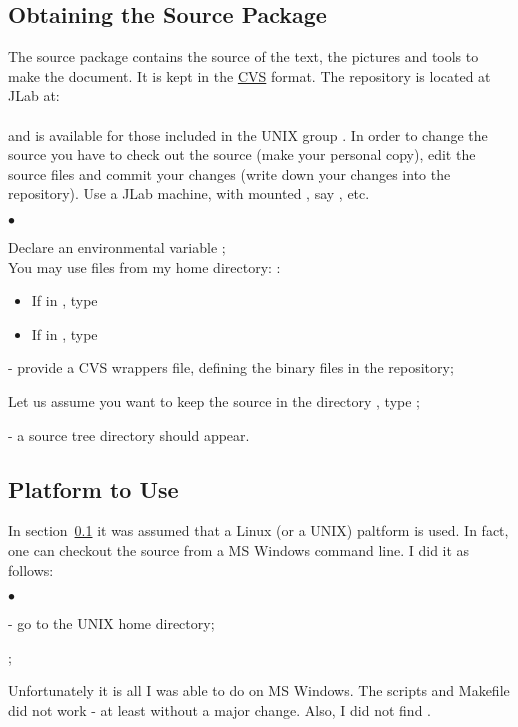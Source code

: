 \documentclass[12pt,letterpaper]{article}
\begin{document}
\subsection{Obtaining the Source Package}
\label{sec:obtain}

 The source package contains the source of the text, 
 the pictures and tools to make the document.
 It is kept in the \href{http://www.cvshome.org/}{CVS}\cite{CVSwww} format.
 The repository is located at JLab at: \\
  \\
 and is available for those included in the UNIX group .
 In order to change the source you have to check out the source
 (make your personal copy), edit the source files and commit
 your changes (write down your changes into the repository). Use
 a JLab machine, with mounted , say ,  etc.
  \begin{list}{$\bullet$}{\setlength{\itemsep}{-0.15cm}}
    \item Declare an environmental variable ;\\
          You may use files from my home directory: :
        \begin{itemize} 
            \item If in , type 
            \item If in , type 
        \end{itemize}
    \item {} - provide a CVS wrappers file,
           defining the binary files in the repository;
    \item Let us assume you want to keep the source in the directory ,
          type ;
    \item {} - a source tree directory 
          should appear. 
  \end{list}
 
   
\subsection{Platform to Use}
\label{sec:platform}   

  In section~\ref{sec:obtain} it was assumed that a Linux (or a UNIX) paltform
  is used. In fact, one can checkout the source from a MS Windows command line.
  I did it as follows:
  \begin{list}{$\bullet$}{\setlength{\itemsep}{-0.15cm}}
    \item {} - go to the UNIX home directory;
    \item {};
  \end{list}
  Unfortunately it is all I was able to do on MS Windows.
  The scripts and Makefile did not work - at least without
  a major change. Also, I did not find .
\end{document}
